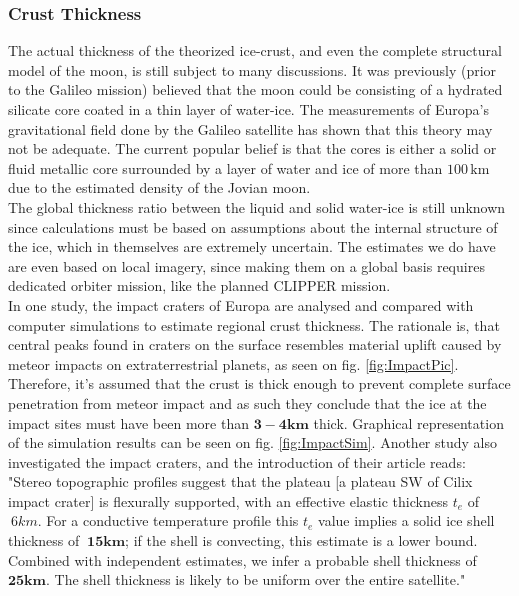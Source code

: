 \subsubsection{Crust Thickness}
The actual thickness of the theorized ice-crust, and even the complete structural model of the moon, is still subject to many discussions. It was previously (prior to the Galileo mission) believed that the moon could be consisting of a hydrated silicate core coated in a thin layer of water-ice. The measurements of Europa's gravitational field done by the Galileo satellite has shown that this theory may not be adequate. The current popular belief is that the cores is either a solid or fluid metallic core surrounded by a layer of water and ice of more than $100\,\mathrm{km}$ due to the estimated density of the Jovian moon. \\
The global thickness ratio between the liquid and solid water-ice is still unknown since calculations must be based on assumptions about the internal structure of the ice, which in themselves are extremely uncertain. The estimates we do have are even based on local imagery, since making them on a global basis requires dedicated orbiter mission, like the planned CLIPPER mission.\\%
In one study, the impact craters of Europa are analysed and compared with computer simulations to estimate regional crust thickness. The rationale is, that central peaks found in craters on the surface resembles material uplift caused by meteor impacts on extraterrestrial planets\cite{ThickImpact}, as seen on fig. \ref{fig:ImpactPic}. Therefore, it's assumed that the crust is thick enough to prevent complete surface penetration from meteor impact and as such they conclude that the ice at the impact sites must have been more than 	$\mathbf{3-4km}$ thick. Graphical representation of the simulation results can be seen on fig. \ref{fig:ImpactSim}. Another study also investigated the impact craters, and the introduction of their article reads: "Stereo topographic profiles suggest that the plateau [a plateau SW of Cilix impact crater] is
flexurally supported, with an effective elastic thickness $t_e$ of
$~6km$. For a conductive temperature profile this $t_e$ value
implies a solid ice shell thickness of $\mathbf{~15km}$; if the shell is
convecting, this estimate is a lower bound. Combined with
independent estimates, we infer a probable shell thickness
of $\mathbf{25 km}$. The shell thickness is likely to be uniform over
the entire satellite."\cite{ThermElast}
